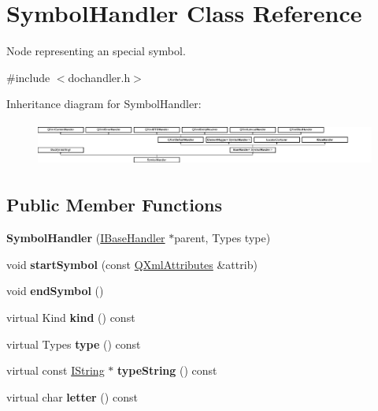 \hypertarget{class_symbol_handler}{}\section{Symbol\+Handler Class Reference}
\label{class_symbol_handler}


Node representing an special symbol.  




{\ttfamily \#include $<$dochandler.\+h$>$}

Inheritance diagram for Symbol\+Handler\+:\begin{figure}[H]
\begin{center}
\leavevmode
\includegraphics[height=1.467890cm]{class_symbol_handler}
\end{center}
\end{figure}
\subsection*{Public Member Functions}
\begin{DoxyCompactItemize}
\item 
\mbox{\label{class_symbol_handler_ab1bd4c35045cf7d7d65bf7a6eec35ccf}} 
{\bfseries Symbol\+Handler} (\mbox{\hyperlink{class_i_base_handler}{I\+Base\+Handler}} $\ast$parent, Types type)
\item 
\mbox{\label{class_symbol_handler_a0bccc7f1ac90bdf67526895f5cbc91ab}} 
void {\bfseries start\+Symbol} (const \mbox{\hyperlink{class_q_xml_attributes}{Q\+Xml\+Attributes}} \&attrib)
\item 
\mbox{\label{class_symbol_handler_aeabd4672a5e8c565ecea54ba5ce024d2}} 
void {\bfseries end\+Symbol} ()
\item 
\mbox{\label{class_symbol_handler_a476f2138cc65ec7b423df60eb2a00921}} 
virtual Kind {\bfseries kind} () const
\item 
\mbox{\label{class_symbol_handler_a0c7e91ae2e8764f56db30d0b22e0a4c5}} 
virtual Types {\bfseries type} () const
\item 
\mbox{\label{class_symbol_handler_a33307b8b9fb65a3ecd4b3426dd9c01be}} 
virtual const \mbox{\hyperlink{class_i_string}{I\+String}} $\ast$ {\bfseries type\+String} () const
\item 
\mbox{\label{class_symbol_handler_a95bd240459a95b61fc592e8980d77118}} 
virtual char {\bfseries letter} () const
\end{DoxyCompactItemize}
